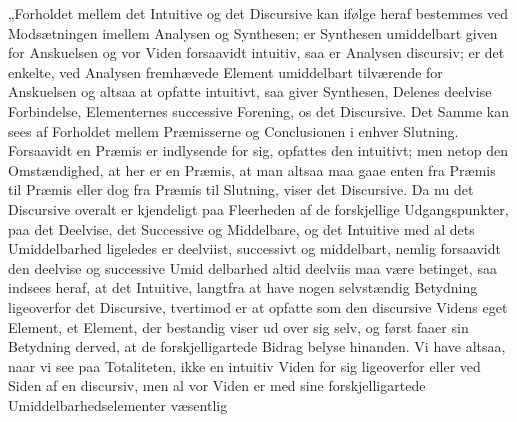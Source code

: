 \documentclass[11pt]{book}
\newcommand{\opage}[1]{\marginnote{\footnotesize\textit{[#1]}}}
\begin{document}
\opage{246} \setcounter{footnote}{0}%
„Forholdet mellem det Intuitive og det Discursive kan ifølge heraf
bestemmes ved Modsætningen imellem Analysen og Synthesen; er Synthesen
umiddelbart given for Anskuelsen og vor Viden forsaavidt intuitiv, saa
er Analysen discursiv; er det enkelte, ved Analysen fremhævede Element
umiddelbart tilværende for Anskuelsen og altsaa at opfatte intuitivt,
saa giver Synthesen, Delenes deelvise Forbindelse, Elementernes
successive Forening, os det Discursive. Det Samme kan sees af Forholdet
mellem Præmisserne og Conclusionen i enhver Slutning. Forsaavidt en
Præmis er indlysende for sig, opfattes den intuitivt; men netop den
Omstændighed, at her er en Præmis, at man altsaa maa gaae enten fra
Præmis til Præmis eller dog fra Præmis til Slutning, viser det
Discursive. Da nu det Discursive overalt er kjendeligt paa Fleerheden
af de forskjellige Udgangspunkter, paa det Deelvise, det Successive og
Middelbare, og det Intuitive med al dets Umiddelbarhed ligeledes er
deelviist, successivt og middelbart, nemlig forsaavidt den deelvise og
successive Umid\-%
delbarhed altid deelviis maa være betinget, saa indsees heraf, at det
Intuitive, langtfra at have nogen selvstændig Betydning ligeoverfor det
Discursive, tvertimod er at opfatte som den discursive Videns eget
Element, et Element, der bestandig viser ud over sig selv, og først
faaer sin Betydning derved, at de forskjelligartede Bidrag belyse
hinanden. Vi have altsaa, naar vi see paa Totaliteten, ikke en intuitiv
Viden for sig ligeoverfor eller ved Siden af en discursiv, men al vor
Viden er med sine forskjelligartede Umiddelbarhedselementer væsentlig
\end{document}
